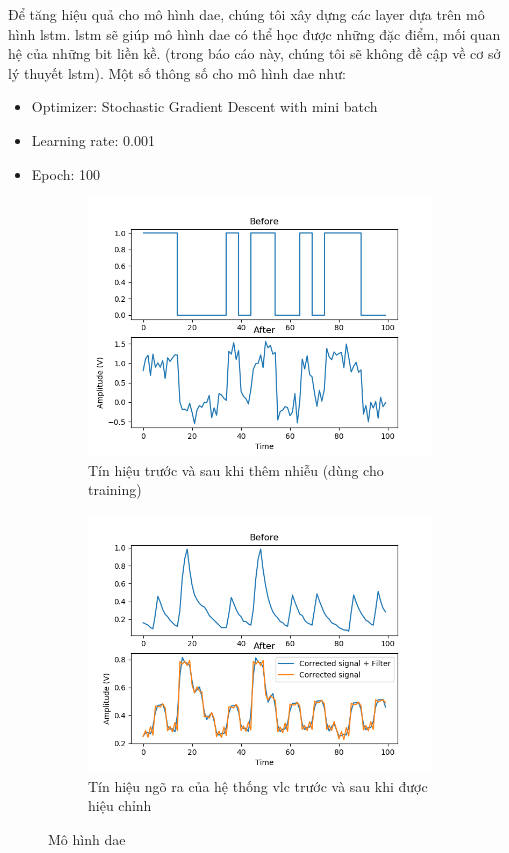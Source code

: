 Để tăng hiệu quả cho mô hình \ac{dae}, chúng tôi xây dựng các layer dựa trên mô hình \ac{lstm}. \ac{lstm} sẽ giúp mô hình \ac{dae} có thể học được những đặc điểm, mối quan hệ của những bit liền kề. (trong báo cáo này, chúng tôi sẽ không đề cập về cơ sở lý thuyết \ac{lstm}).
Một số thông số cho mô hình \ac{dae} như:
\begin{itemize}
\item Optimizer: Stochastic Gradient Descent with mini batch
\item Learning rate: 0.001
\item Epoch: 100
\end{itemize}

\begin{figure}
	\centering
	\begin{subfigure}{.45\textwidth}
		  \centering
		  \includegraphics[width=1\linewidth]{Image/dae_noise_injection}
		  \caption{Tín hiệu trước và sau khi thêm nhiễu (dùng cho training)}
		  \label{fig: floor_noise}
	\end{subfigure}
	\begin{subfigure}{.45\textwidth}
		  \centering
		  \includegraphics[width=1\linewidth]{Image/corrected_signal}
		  \caption{Tín hiệu ngõ ra của hệ thống \ac{vlc} trước và sau khi được hiệu chỉnh}
		  \label{fig: fluo_noise}
	\end{subfigure}
	\caption{Mô hình \ac{dae}}
	\label{fig:dae}
\end{figure}

